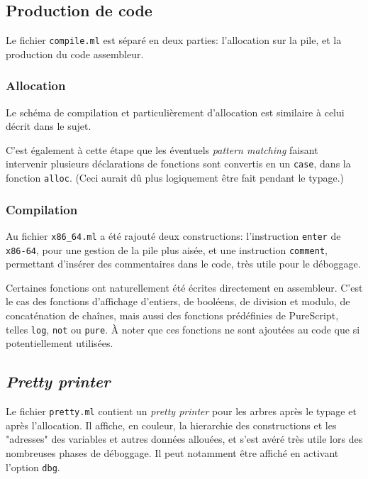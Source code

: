 \documentclass[12pt,a4paper]{article}
\begin{document}
\subsection{Production de code}
Le fichier \texttt{compile.ml} est séparé en deux parties: l'allocation sur la pile, et la production du code assembleur.  

\subsubsection{Allocation}
Le schéma de compilation et particulièrement d'allocation est similaire à celui décrit dans le sujet. 

C'est également à cette étape que les éventuels \emph{pattern matching} faisant intervenir plusieurs déclarations de fonctions sont convertis en un \texttt{case}, dans la fonction \texttt{alloc}. (Ceci aurait dû plus logiquement être fait pendant le typage.)

\subsubsection{Compilation}
Au fichier \texttt{x86\_64.ml} a été rajouté deux constructions: l'instruction \texttt{enter} de \texttt{x86-64}, pour une gestion de la pile plus aisée, et une instruction \texttt{comment}, permettant d'insérer des commentaires dans le code, très utile pour le déboggage. 

Certaines fonctions ont naturellement été écrites directement en assembleur. C'est le cas des fonctions d'affichage d'entiers, de booléens, de division et modulo, de concaténation de chaînes, mais aussi des fonctions prédéfinies de PureScript, telles \texttt{log}, \texttt{not} ou \texttt{pure}. À noter que ces fonctions ne sont ajoutées au code que si potentiellement utilisées.

\subsection{\emph{Pretty printer}}
Le fichier \texttt{pretty.ml} contient un \emph{pretty printer} pour les arbres après le typage et après l'allocation. Il affiche, en couleur, la hierarchie des constructions et les "adresses" des variables et autres données allouées, et s'est avéré très utile lors des nombreuses phases de déboggage. Il peut notamment être affiché en activant l'option \texttt{\textendash \textendash dbg}.
\end{document}
